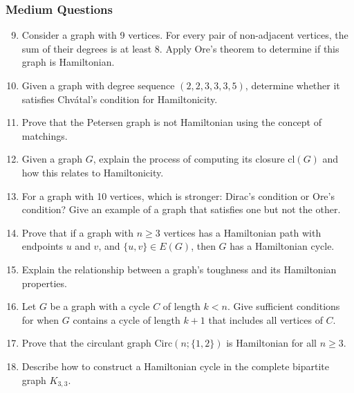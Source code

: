 \documentclass{article}
\theoremstyle{definition}
\begin{document}
\subsubsection{Medium Questions}
\begin{enumerate}\setcounter{enumi}{8}
\item Consider a graph with 9 vertices. For every pair of non-adjacent vertices, the sum of their degrees is at least 8. Apply Ore's theorem to determine if this graph is Hamiltonian.

\item Given a graph with degree sequence $(2, 2, 3, 3, 3, 5)$, determine whether it satisfies Chvátal's condition for Hamiltonicity.

\item Prove that the Petersen graph is not Hamiltonian using the concept of matchings.

\item Given a graph $G$, explain the process of computing its closure $\text{cl}(G)$ and how this relates to Hamiltonicity.

\item For a graph with 10 vertices, which is stronger: Dirac's condition or Ore's condition? Give an example of a graph that satisfies one but not the other.

\item Prove that if a graph with $n \geq 3$ vertices has a Hamiltonian path with endpoints $u$ and $v$, and $\{u,v\} \in E(G)$, then $G$ has a Hamiltonian cycle.

\item Explain the relationship between a graph's toughness and its Hamiltonian properties.

\item Let $G$ be a graph with a cycle $C$ of length $k < n$. Give sufficient conditions for when $G$ contains a cycle of length $k+1$ that includes all vertices of $C$.

\item Prove that the circulant graph $\text{Circ}(n;\{1,2\})$ is Hamiltonian for all $n \geq 3$.

\item Describe how to construct a Hamiltonian cycle in the complete bipartite graph $K_{3,3}$.
\end{enumerate}
\end{document}
